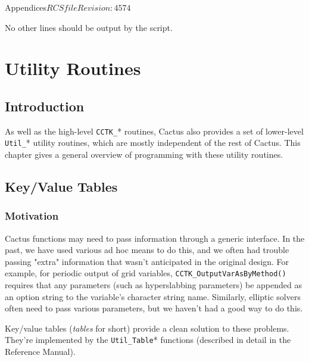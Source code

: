 \begin{cactuspart}{Appendices}{$RCSfile$}{$Revision: 4574 $}
\begin{itemize}
\end{itemize}

No other lines should be output by the script.


\chapter{Utility Routines}

\section{Introduction}

As well as the high-level \verb|CCTK_|* routines, Cactus also
provides a set of lower-level \verb|Util_|* utility routines, which
are mostly independent of the rest of Cactus.  This chapter gives a
general overview of programming with these utility routines.


\section{Key/Value Tables}


\subsection{Motivation}

Cactus functions may need to pass information through a generic
interface.  In the past, we have used various ad hoc means to do this,
and we often had trouble passing "extra" information that wasn't
anticipated in the original design.  For example, for periodic output
of grid variables,
\verb|CCTK_OutputVarAsByMethod()| requires that
any parameters (such as hyperslabbing parameters) be appended as an option
string to the variable's character string name.  Similarly, elliptic
solvers often need to pass various parameters, but we haven't had a
good way to do this.

Key/value tables (\textit{tables} for short) provide a clean solution
to these problems.  They're implemented by the \verb|Util_Table|*
functions (described in detail in the Reference Manual).


\end{cactuspart}
